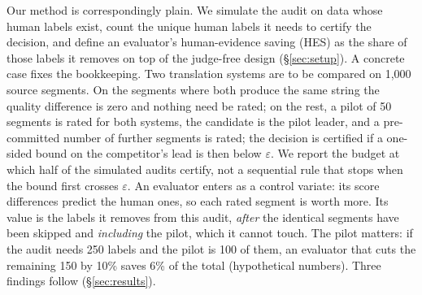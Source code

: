\documentclass[11pt]{article}
\newcommand{\eps}{\varepsilon}
\begin{document}
Our method is correspondingly plain. We simulate the audit on data whose human labels exist, count the unique human labels
it needs to certify the decision, and define an evaluator's human-evidence saving (HES) as the share of those labels it
removes on top of the judge-free design (\S\ref{sec:setup}). A concrete case fixes the bookkeeping. Two translation
systems are to be compared on 1{,}000 source segments. On the segments where both produce the same string the quality
difference is zero and nothing need be rated; on the rest, a pilot of 50 segments is rated for both systems, the
candidate is the pilot leader, and a pre-committed number of further segments is rated; the decision is certified if
a one-sided bound on the competitor's lead is then below $\eps$. We report the budget at which half of the simulated
audits certify, not a sequential rule that stops when the bound first crosses $\eps$. An evaluator enters as a control variate: its score differences predict the human ones, so each rated
segment is worth more. Its value is the labels it removes from this audit, \emph{after} the identical segments have
been skipped and \emph{including} the pilot, which it cannot touch. The pilot matters: if the audit needs 250 labels
and the pilot is 100 of them, an evaluator that cuts the remaining 150 by 10\% saves 6\% of the total (hypothetical
numbers). Three findings follow (\S\ref{sec:results}).
\end{document}
